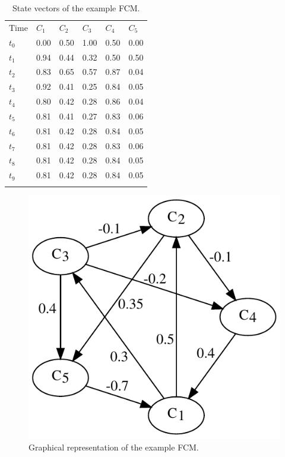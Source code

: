 \documentclass[graybox]{svmult}
\begin{document}
\begin{table}[!t]
\caption{State vectors of the example FCM.}
\label{tab:exampleStates}
\begin{tabular}{p{1cm}p{1cm}p{1cm}p{1cm}p{1cm}p{1cm}}
\hline\noalign{\smallskip}
Time & $C_1$ & $C_2$ & $C_3$ & $C_4$ & $C_5$ \\
\noalign{\smallskip}\svhline\noalign{\smallskip}
$t_0$ & 0.00 & 0.50 & 1.00 & 0.50 & 0.00 \\
$t_1$ & 0.94 & 0.44 & 0.32 & 0.50 & 0.50 \\
$t_2$ & 0.83 & 0.65 & 0.57 & 0.87 & 0.04 \\
$t_3$ & 0.92 & 0.41 & 0.25 & 0.84 & 0.05 \\
$t_4$ & 0.80 & 0.42 & 0.28 & 0.86 & 0.04 \\
$t_5$ & 0.81 & 0.41 & 0.27 & 0.83 & 0.06 \\
$t_6$ & 0.81 & 0.42 & 0.28 & 0.84 & 0.05 \\
$t_7$ & 0.81 & 0.42 & 0.28 & 0.83 & 0.06 \\
$t_8$ & 0.81 & 0.42 & 0.28 & 0.84 & 0.05 \\
$t_9$ & 0.81 & 0.42 & 0.28 & 0.84 & 0.05 \\
\noalign{\smallskip}\hline\noalign{\smallskip}
\end{tabular}
\end{table}

\begin{figure}[hbt]
  \sidecaption
  \includegraphics[scale=0.5]{simulation/graph.pdf}
  \caption{Graphical representation of the example FCM.}
  \label{fig:exampleGraph}
\end{figure}
\end{document}
